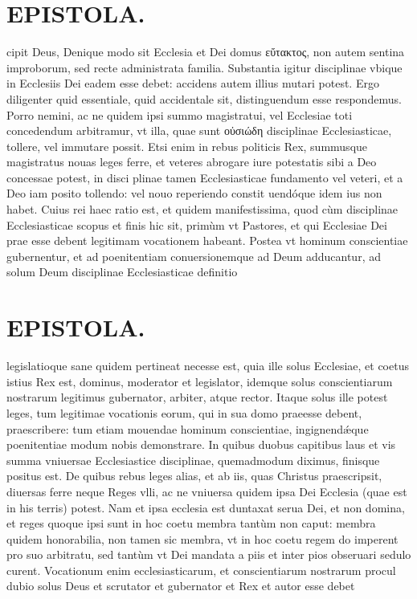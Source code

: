 \documentclass{article}
\begin{document}
\begin{pages}
\section*{EPISTOLA. }\pstart cipit Deus, Denique modo sit Ecclesia et Dei domus εὔτακτος, non autem sentina improborum, sed recte administrata familia. Substantia igitur disciplinae vbique in Ecclesiis Dei eadem esse debet: accidens autem illius mutari potest. Ergo diligenter quid essentiale, quid accidentale sit, distinguendum esse respondemus. Porro nemini, ac ne quidem ipsi summo magistratui, vel Ecclesiae toti concedendum arbitramur, vt illa, quae sunt οὐσιώδη disciplinae Ecclesiasticae, tollere, vel immutare possit. Etsi enim in rebus politicis Rex, summusque magistratus nouas leges ferre, et veteres abrogare iure potestatis sibi a Deo concessae potest, in disci plinae tamen Ecclesiasticae fundamento vel veteri, et a Deo iam posito tollendo: vel nouo reperiendo constit uendóque idem ius non habet. Cuius rei haec ratio est, et quidem manifestissima, quod cùm disciplinae Ecclesiasticae scopus et finis hic sit, primùm vt Pastores, et qui Ecclesiae Dei prae esse debent legitimam vocationem habeant. Postea vt hominum conscientiae gubernentur, et ad poenitentiam conuersionemque ad Deum adducantur, ad solum Deum disciplinae Ecclesiasticae definitio  \pend
\section*{EPISTOLA. }\pstart legislatioque sane quidem pertineat necesse est, quia ille solus Ecclesiae, et coetus istius Rex est, dominus, moderator et legislator, idemque solus conscientiarum nostrarum legitimus gubernator, arbiter, atque rector. Itaque solus ille potest leges, tum legitimae vocationis eorum, qui in sua domo praeesse debent, praescribere: tum etiam mouendae hominum conscientiae, ingignendǽque poenitentiae modum nobis demonstrare. In quibus duobus capitibus laus et vis summa vniuersae Ecclesiastice disciplinae, quemadmodum diximus, finisque positus est. De quibus rebus leges alias, et ab iis, quas Christus praescripsit, diuersas ferre neque Reges vlli, ac ne vniuersa quidem ipsa Dei Ecclesia (quae est in his terris) potest. Nam et ipsa ecclesia est duntaxat serua Dei, et non domina, et reges quoque ipsi sunt in hoc coetu membra tantùm non caput: membra quidem honorabilia, non tamen sic membra, vt in hoc coetu regem do imperent pro suo arbitratu, sed tantùm vt Dei mandata a piis et inter pios obseruari sedulo curent. Vocationum enim ecclesiasticarum, et conscientiarum nostrarum procul dubio solus Deus et scrutator et gubernator et Rex et autor esse debet  \pend

\end{pages}
\end{document}
